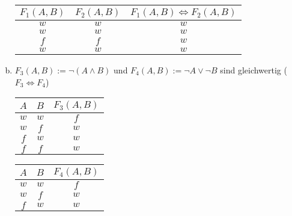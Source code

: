 \documentclass[10pt, oneside]{article}
\begin{document}
\begin{enumerate}[a)]
\begin{table*}[h]
        \begin{minipage}{1\linewidth}
            \centering
            \begin{tabular}{|c|c|c|}
                \hline
                $F_1(A, B)$ & $F_2(A, B)$ & $F_1(A, B) \Leftrightarrow F_2(A, B)$ \\
                \hline
                $w$ & $w$ & $w$ \\
                \hline
                $w$ & $w$ & $w$ \\
                \hline
                $f$ & $f$ & $w$ \\
                \hline
                $w$ & $w$ & $w$ \\
                \hline
            \end{tabular}
        \end{minipage}
    \end{table*}
    \item $F_3(A, B) := \lnot (A \land B)$ und $F_4(A, B) := \lnot A \lor \lnot
        B$ sind gleichwertig ($F_3 \Leftrightarrow F_4$)
    \begin{table*}[h]
        \centering
        \begin{minipage}{.29\linewidth}
            \centering
            \begin{tabular}{|c|c|c|}
                \hline
                $A$ & $B$ & $F_3(A, B)$ \\
                \hline
                $w$ & $w$ & $f$ \\
                \hline
                $w$ & $f$ & $w$ \\
                \hline
                $f$ & $w$ & $w$ \\
                \hline
                $f$ & $f$ & $w$ \\
                \hline
            \end{tabular}
        \end{minipage}%
        \begin{minipage}{.29\linewidth}
            \centering
            \begin{tabular}{|c|c|c|}
                \hline
                $A$ & $B$ & $F_4(A, B)$ \\
                \hline
                $w$ & $w$ & $f$ \\
                \hline
                $w$ & $f$ & $w$ \\
                \hline
                $f$ & $w$ & $w$ \\
                \hline

\end{tabular}
\end{minipage}
\end{table*}
\end{enumerate}
\end{document}
